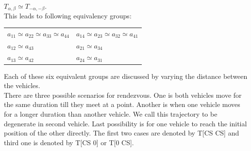 \documentclass[11pt]{article} %
\begin{document}
$T_{\alpha,\beta} \simeq T_{-\alpha,-\beta} $.\\
This leads to following equivalency groups:
\begin{table}[H]
\centering
\begin{tabular}{ll}
$a_{11} \simeq a_{22}  \simeq a_{33} \simeq a_{44}$		& $a_{14} \simeq a_{23} \simeq a_{32} \simeq a_{41}$\\
$a_{12} \simeq a_{43}$ 		&  $a_{21} \simeq a_{34}$\\ 
$a_{13} \simeq a_{42}$ 		&  $a_{24} \simeq a_{31}$
\end{tabular}
\end{table}
Each of these six equivalent groups are discussed by varying the distance between the vehicles.\\
There are three possible scenarios for rendezvous. One is both vehicles move for the same duration till they meet at a point. Another is when one vehicle moves for a longer duration than another vehicle. We call this trajectory to be degenerate in second vehicle.
Last possibility is for one vehicle to reach the initial position of the other directly. The first two cases are denoted by T[CS CS] and third one is denoted by T[CS 0] or T[0 CS].
\end{document}
